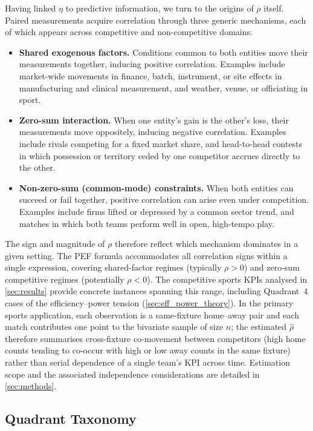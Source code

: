 Having linked $\eta$ to predictive information, we turn to the origins of $\rho$ itself. Paired measurements acquire correlation through three generic mechanisms, each of which appears across competitive and non-competitive domains:
\begin{itemize}
  \item \textbf{Shared exogenous factors.} Conditions common to both entities move their measurements together, inducing positive correlation. Examples include market-wide movements in finance, batch, instrument, or site effects in manufacturing and clinical measurement, and weather, venue, or officiating in sport.
  \item \textbf{Zero-sum interaction.} When one entity's gain is the other's loss, their measurements move oppositely, inducing negative correlation. Examples include rivals competing for a fixed market share, and head-to-head contests in which possession or territory ceded by one competitor accrues directly to the other.
  \item \textbf{Non-zero-sum (common-mode) constraints.} When both entities can succeed or fail together, positive correlation can arise even under competition. Examples include firms lifted or depressed by a common sector trend, and matches in which both teams perform well in open, high-tempo play.
\end{itemize}
The sign and magnitude of $\rho$ therefore reflect which mechanism dominates in a given setting. The PEF formula accommodates all correlation signs within a single expression, covering shared-factor regimes (typically $\rho>0$) and zero-sum competitive regimes (potentially $\rho<0$). The competitive sports KPIs analysed in \cref{sec:results} provide concrete instances spanning this range, including Quadrant~4 cases of the efficiency--power tension (\cref{sec:eff_power_theory}). In the primary sports application, each observation is a same-fixture home--away pair and each match contributes one point to the bivariate sample of size $n$; the estimated $\hat\rho$ therefore summarises cross-fixture co-movement between competitors (high home counts tending to co-occur with high or low away counts in the same fixture) rather than serial dependence of a single team's KPI across time. Estimation scope and the associated independence considerations are detailed in \cref{sec:methods}.

\subsection{Quadrant Taxonomy}

